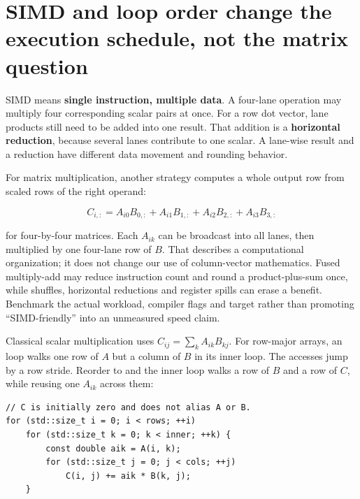 \section{SIMD and loop order change the execution schedule, not the matrix question}\label{02-foundations-ii-ch038-simd-and-loop-order-change-the-execution-schedule-not-the-matrix-question}

\hypertarget{02-foundations-ii-ch038-simd-and-loop-order-change-the-execution-schedule-not-the-matrix-question}{}

SIMD means \textbf{single instruction, multiple data}. A four-lane operation may multiply four corresponding scalar pairs at once. For a row dot vector, lane products still need to be added into one result. That addition is a \textbf{horizontal reduction}, because several lanes contribute to one scalar. A lane-wise result and a reduction have different data movement and rounding behavior.

For matrix multiplication, another strategy computes a whole output row from scaled rows of the right operand:

\[
C_{i,:}=A_{i0}B_{0,:}+A_{i1}B_{1,:}+A_{i2}B_{2,:}+A_{i3}B_{3,:}
\]

for four-by-four matrices. Each \(A_{ik}\) can be broadcast into all lanes, then multiplied by one four-lane row of \(B\). That describes a computational organization; it does not change our use of column-vector mathematics. Fused multiply-add may reduce instruction count and round a product-plus-sum once, while shuffles, horizontal reductions and register spills can erase a benefit. Benchmark the actual workload, compiler flags and target rather than promoting ``SIMD-friendly'' into an unmeasured speed claim.

Classical scalar multiplication uses \(C_{ij}=\sum_k A_{ik}B_{kj}\). For row-major arrays, an  loop walks one row of \(A\) but a column of \(B\) in its inner loop. The  accesses jump by a row stride. Reorder to  and the inner loop walks a row of \(B\) and a row of \(C\), while reusing one \(A_{ik}\) across them:

\begin{verbatim}
// C is initially zero and does not alias A or B.
for (std::size_t i = 0; i < rows; ++i)
    for (std::size_t k = 0; k < inner; ++k) {
        const double aik = A(i, k);
        for (std::size_t j = 0; j < cols; ++j)
            C(i, j) += aik * B(k, j);
    }
\end{verbatim}

